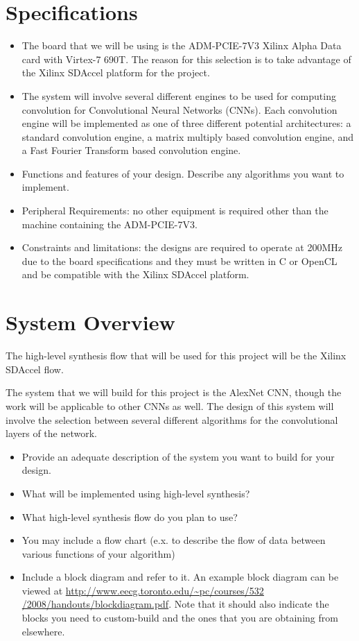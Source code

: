 \documentclass[conference,compsoc]{IEEEtran/IEEEtran}
\begin{document}
\section{Specifications}\label{section:spec}
\begin{itemize}
\item The board that we will be using is the ADM-PCIE-7V3 Xilinx Alpha Data card
with Virtex-7 690T. The reason for this selection is to take advantage of the
Xilinx SDAccel platform for the project.

\item The system will involve several different engines to be used for computing
convolution for Convolutional Neural Networks (CNNs). Each convolution engine
will be implemented as one of three different potential architectures: a standard
convolution engine, a matrix multiply based convolution engine, and a Fast Fourier
Transform based convolution engine.

\item Functions and features of your design.
Describe any algorithms you want to implement.


\item Peripheral Requirements: no other equipment is required other than the machine
containing the ADM-PCIE-7V3.
\item Constraints and limitations: the designs are required to operate at 200MHz due
to the board specifications and they must be written in C or OpenCL and be compatible
with the Xilinx SDAccel platform.
\end{itemize}

\section{System Overview}\label{section:overview}

The high-level synthesis flow that will be used for this project will be the Xilinx
SDAccel flow.

The system that we will build for this project is the AlexNet CNN, though the work
will be applicable to other CNNs as well. The design of this system will involve the
selection between several different algorithms for the convolutional layers of the
network.

\begin{itemize}
\item Provide an adequate description of the system you want to build for your design.
\item What will be implemented using high-level synthesis?
\item What high-level synthesis flow do you plan to use?
\item You may include a flow chart (e.x. to describe the flow of data between various functions of your algorithm)
\item Include a block diagram and refer to it.
An example block diagram can be viewed at \href{http://www.eecg.toronto.edu/~pc/courses/532/2008/handouts/blockdiagram.pdf}{http://www.eecg.toronto.edu/\~{}pc/courses/532 /2008/handouts/blockdiagram.pdf}.
Note that it should also indicate the blocks you need to custom-build and the ones that you are obtaining from elsewhere.
\end{itemize}
\end{document}
